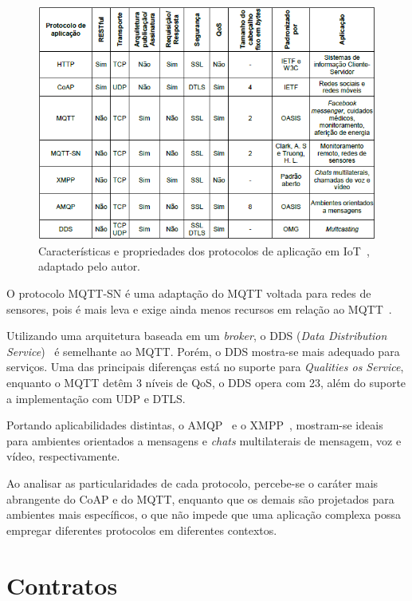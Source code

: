 \begin{figure}[ht]
	\centering
	\includegraphics[width=1\textwidth]{imagens/tabela_protocolos.png}
	\caption{Características e propriedades dos protocolos de aplicação em IoT~\cite{sankarinternet}, adaptado pelo autor.
		\label{fig:tabela_protocolos}}
\end{figure}
\FloatBarrier

O protocolo MQTT-SN é uma adaptação do MQTT voltada para redes de sensores, pois é mais leva e exige ainda menos recursos em relação ao MQTT~\cite{stanford2013mqtt}.

Utilizando uma arquitetura baseada em um \textit{broker}, o DDS (\textit{Data Distribution Service})~\cite{dds2015specifi} é semelhante ao MQTT. Porém, o DDS mostra-se mais adequado para serviços. Uma das principais diferenças está no suporte para \textit{Qualities os Service}, enquanto o MQTT detêm 3 níveis de QoS, o DDS opera com 23, além do suporte a implementação com UDP e DTLS.

Portando aplicabilidades distintas, o AMQP~\cite{amqp2012oasis} e o XMPP~\cite{xmpp2011extensiblem}, mostram-se ideais para ambientes orientados a mensagens e \textit{chats} multilaterais de mensagem, voz e vídeo, respectivamente.

Ao analisar as particularidades de cada protocolo, percebe-se o caráter mais abrangente do CoAP e do MQTT, enquanto que os demais são projetados para ambientes mais específicos, o que não impede que uma aplicação complexa possa empregar diferentes protocolos em diferentes contextos.   

\section{Contratos}

